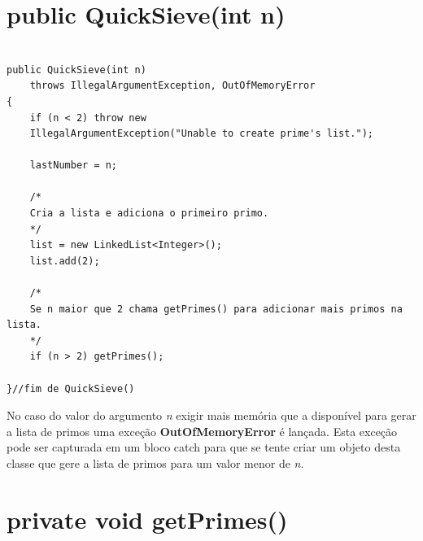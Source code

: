 \documentclass[a4paper,12pt,openany]{book}
\begin{document}
\section*{public QuickSieve(int n)}

\begin{lstlisting}

public QuickSieve(int n)
	throws IllegalArgumentException, OutOfMemoryError
{
	if (n < 2) throw new
	IllegalArgumentException("Unable to create prime's list.");
	
	lastNumber = n;
	
	/*
	Cria a lista e adiciona o primeiro primo.
	*/
	list = new LinkedList<Integer>();
	list.add(2);
	
	/*
	Se n maior que 2 chama getPrimes() para adicionar mais primos na lista.
	*/
	if (n > 2) getPrimes();

}//fim de QuickSieve()

\end{lstlisting}

No caso do valor do argumento \textit{n} exigir mais memória que a disponível para gerar a lista de primos uma exceção \textbf{OutOfMemoryError} é lançada. Esta exceção pode ser capturada em um bloco catch para que se tente criar um objeto desta classe que gere a lista de primos para um valor menor de \textit{n}.

\section*{private void getPrimes()}
\end{document}
